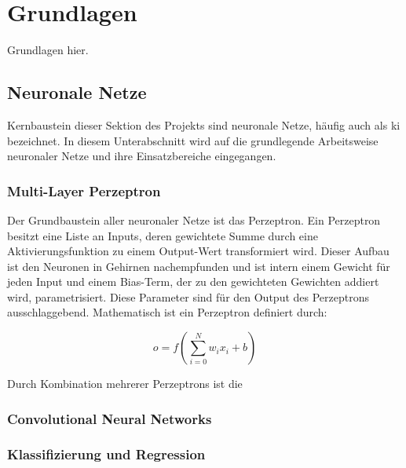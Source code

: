 
\section{Grundlagen}
\label{sec:ki:grundlagen}

Grundlagen hier.

\subsection{Neuronale Netze}
\label{sec:neuronale_letze}

Kernbaustein dieser Sektion des Projekts sind neuronale Netze, häufig auch als \ac{ki} bezeichnet. In diesem Unterabschnitt wird auf die grundlegende Arbeitsweise neuronaler Netze und ihre Einsatzbereiche eingegangen.

\subsubsection{Multi-Layer Perzeptron}
\label{sec:multi_layer_perceptron}

Der Grundbaustein aller neuronaler Netze ist das Perzeptron. Ein Perzeptron besitzt eine Liste an Inputs, deren gewichtete Summe durch eine Aktivierungsfunktion zu einem Output-Wert transformiert wird. Dieser Aufbau ist den Neuronen in Gehirnen nachempfunden und ist intern einem Gewicht für jeden Input und einem Bias-Term, der zu den gewichteten Gewichten addiert wird, parametrisiert. Diese Parameter sind für den Output des Perzeptrons ausschlaggebend. Mathematisch ist ein Perzeptron definiert durch:

\[ o = f \left(\sum_{i=0}^{N} w_i x_i + b \right) \]

Durch Kombination mehrerer Perzeptrons ist die 


\subsubsection{Convolutional Neural Networks}
\label{sec:cnn}


\subsubsection{Klassifizierung und Regression}
\label{sec:klassifizierung_regression}

